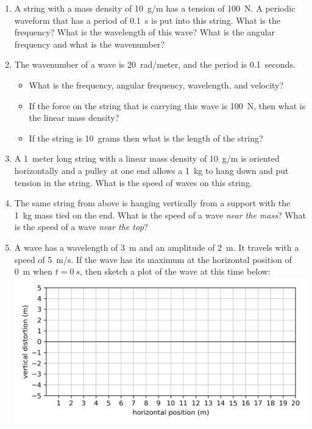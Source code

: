 \begin{enumerate}
	\item
	A string with a mass density of \SI{10}{g/m} has a tension of \SI{100}{N}. A periodic waveform that has a period of \SI{0.1}{s} is put into this string. What is the frequency? What is the wavelength of this wave? What is the angular frequency and what is the wavenumber?
	
	\item
	The wavenumber of a wave is \SI{20}{rad/meter}, and the period is \SI{0.1}{seconds}. 
	\begin{itemize}
		\setlength\itemsep{1 in}
		\item What is the frequency, angular frequency, wavelength, and velocity?
		\item If the force on the string that is carrying this wave is \SI{100}{N}, then what is the linear mass density?
		\item If the string is \SI{10}{grams} then what is the length of the string?
	\end{itemize}
	
	\item
	A \SI{1}{meter} long string with a linear mass density of \SI{10}{g/m} is oriented horizontally and a pulley at one end allows a \SI{1}{kg} to hang down and put tension in the string. What is the speed of waves on this string. 
	
	\item 
	The same string from above is hanging vertically from a support with the \SI{1}{kg} mass tied on the end. What is the speed of a wave \emph{near the mass}? What is the speed of a wave \emph{near the top}?
	
	\item
	A wave has a wavelength of \SI{3}{m} and an amplitude of \SI{2}{m}. It travels with a speed of \SI{5}{m/s}. If the wave has its maximum at the horizontal position of \SI{0}{m} when $t=\SI{0}{s}$, then sketch a plot of the wave at this time below:  \\
	\includegraphics[scale=1]{week13-blank-plot.png}
	

\end{enumerate}
